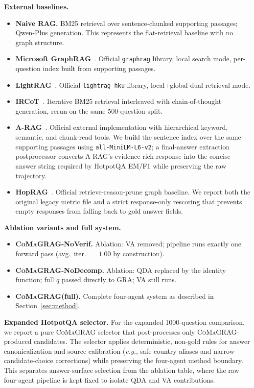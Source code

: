 \documentclass[runningheads]{llncs}
\newcommand{\sys}{\textsc{CoMaGRAG}\xspace}
\newcommand{\eg}{\emph{e.g.},\xspace}
\begin{document}
\smallskip\noindent\textbf{External baselines.}
\begin{itemize}
  \item \textbf{Naive RAG.} BM25 retrieval over sentence-chunked supporting
        passages; Qwen-Plus generation. This represents the flat-retrieval
        baseline with no graph structure.
  \item \textbf{Microsoft GraphRAG}~\cite{edge2024graphrag}. Official
        \texttt{graphrag} library, local search mode, per-question index built
        from supporting passages.
  \item \textbf{LightRAG}~\cite{guo2024lightrag}. Official \texttt{lightrag-hku}
        library, local+global dual retrieval mode.
  \item \textbf{IRCoT}~\cite{trivedi2022ircot}. Iterative BM25 retrieval
        interleaved with chain-of-thought generation, rerun on the same
        500-question split.
  \item \textbf{A-RAG}~\cite{arag2026}. Official external implementation with
        hierarchical keyword, semantic, and chunk-read tools. We build the
        sentence index over the same supporting passages using
        \texttt{all-MiniLM-L6-v2}; a final-answer extraction postprocessor
        converts A-RAG's evidence-rich response into the concise answer string
        required by HotpotQA EM/F1 while preserving the raw trajectory.
  \item \textbf{HopRAG}~\cite{yu2025hoprag}. Official retrieve-reason-prune
        graph baseline. We report both the original legacy metric file and a
        strict response-only rescoring that prevents empty responses from
        falling back to gold answer fields.
\end{itemize}

\smallskip\noindent\textbf{Ablation variants and full system.}
\begin{itemize}
  \item \textbf{\sys-NoVerif.} Ablation: VA removed; pipeline runs exactly
        one forward pass (avg.\ iter.\ $=1.00$ by construction).
  \item \textbf{\sys-NoDecomp.} Ablation: QDA replaced by the identity
        function; full $q$ passed directly to GRA; VA still runs.
  \item \textbf{\sys (full).} Complete four-agent system as described in
        Section~\ref{sec:method}.
\end{itemize}

\smallskip\noindent\textbf{Expanded HotpotQA selector.}
For the expanded 1000-question comparison, we report a pure \sys selector that
post-processes only \sys-produced candidates. The selector applies
deterministic, non-gold rules for answer canonicalization and source
calibration (\eg safe country aliases and narrow candidate-choice corrections)
while preserving the four-agent method boundary. This separates answer-surface
selection from the ablation table, where the raw four-agent pipeline is kept
fixed to isolate QDA and VA contributions.
\end{document}
